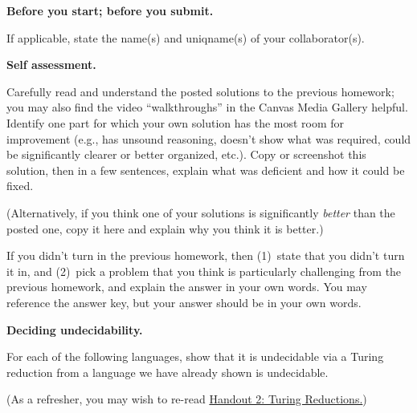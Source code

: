 \documentclass[11pt,addpoints]{exam}
\begin{document}
\begin{questions}
  \addtocounter{question}{-1}

  \question[0] \textbf{Before you start; before you submit.}
  
  If applicable, state the name(s) and uniqname(s) of your collaborator(s).

  \begin{solution}

  \end{solution}
  
  \question[10] \textbf{Self assessment.}
  
  Carefully read and understand the posted solutions to the previous homework; you may also find the video ``walkthroughs'' in the Canvas Media Gallery helpful.
  Identify one part for which your own solution has the most room for improvement (e.g., has unsound reasoning, doesn’t show what was required, could be significantly clearer or better organized, etc.).
  Copy or screenshot this solution, then in a few sentences, explain what was deficient and how it could be fixed.

  (Alternatively, if you think one of your solutions is significantly \emph{better} than the posted one, copy it here and explain why you think it is better.)

  If you didn't turn in the previous homework, then (1)~state that you didn't turn it in, and (2)~pick a problem that you think is particularly challenging from the previous homework, and explain the answer in your own words.
  You may reference the answer key, but your answer should be in your own words.

  \begin{solution}

  \end{solution}

  \question \textbf{Deciding undecidability.}

  For each of the following languages, show that it is undecidable via a Turing reduction from a language we have already shown is undecidable.

  (As a refresher, you may wish to re-read \href{https://drive.google.com/file/d/1PD6hTzUNgU3oUzA2YbcIkSP7i33B5oAr/view?usp=drive_link}{Handout 2: Turing Reductions.})

\end{questions}
\end{document}
